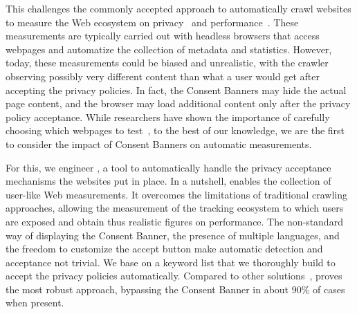 This challenges the commonly accepted approach to automatically crawl websites to measure the Web ecosystem on privacy~\cite{acar2014web,falahrastegar2014rise,metwalley2015online,englehardt2016online,pujol2015annoyed,iordanou2018tracing,hu2019characterising,rizzo2021unveiling,papadogiannakis2021, vandrevu2019what, pujol2015annoyed, traverso2017benchmark, mazel2019comparison} and performance~\cite{wang2014speedy, de2015http, erman2015towards, bocchi2016measuring, alay2017experience, asrese2019measuring, ruamviboonsuk2017vroom, sivakumar2014parcel, netravali2015mahimahi}. These measurements are typically carried out with headless browsers that access webpages and automatize the collection of metadata and statistics. However, today, these measurements could be biased and unrealistic, with the crawler observing possibly very different content than what a user would get after accepting the privacy policies. In fact, the Consent Banners may hide the actual page content, and the browser may load additional content only after the privacy policy acceptance.
While researchers have shown the importance of carefully choosing which webpages to test~\cite{aqeel2020on}, to the best of our knowledge, we are the first to consider the impact of Consent Banners on automatic measurements.

For this, we engineer \TOOL, a tool to automatically handle the privacy acceptance mechanisms the websites put in place. In a nutshell, \TOOL enables the collection of user-like Web measurements. It overcomes the limitations of traditional crawling approaches, allowing the measurement of the tracking ecosystem to which users are exposed and obtain thus realistic figures on performance. The non-standard way of displaying the Consent Banner, the presence of multiple languages, and the freedom to customize the accept button make automatic detection and acceptance not trivial. We base \TOOL on a keyword list that we thoroughly build to accept the privacy policies automatically. Compared to other solutions~\cite{idontcare,remove,ninja,consentomatic}, \TOOL proves the most robust approach, bypassing the Consent Banner in about $90\%$ of cases when present.

